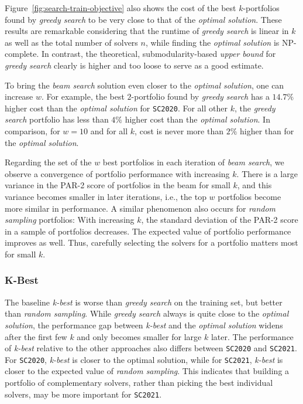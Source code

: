 \documentclass[runningheads]{llncs}
\begin{document}
Figure~\ref{fig:search-train-objective} also shows the cost of the best $k$-portfolios found by \emph{greedy search} to be very close to that of the \emph{optimal solution}.
These results are remarkable considering that the runtime of \emph{greedy search} is linear in $k$ as well as the total number of solvers $n$, while finding the \emph{optimal solution} is NP-complete.
In contrast, the theoretical, submodularity-based \emph{upper bound} for \emph{greedy search} clearly is higher and too loose to serve as a good estimate.

To bring the \emph{beam search} solution even closer to the \emph{optimal solution}, one can increase $w$.
For example, the best $2$-portfolio found by \emph{greedy search} has a $14.7\%$ higher cost than the \emph{optimal solution} for \texttt{SC2020}.
For all other $k$, the \emph{greedy search} portfolio has less than $4\%$ higher cost than the \emph{optimal solution}.
In comparison, for $w=10$ and for all $k$, cost is never more than $2\%$ higher than for the \emph{optimal solution}.

Regarding the set of the $w$ best portfolios in each iteration of \emph{beam search}, we observe a convergence of portfolio performance with increasing $k$. 
There is a large variance in the PAR-2 score of portfolios in the beam for small $k$, and this variance becomes smaller in later iterations, i.e., the top $w$ portfolios become more similar in performance.
A similar phenomenon also occurs for \emph{random sampling} portfolios:
With increasing $k$, the standard deviation of the PAR-2 score in a sample of portfolios decreases.
The expected value of portfolio performance improves as well.
Thus, carefully selecting the solvers for a portfolio matters most for small $k$.

\subsubsection{K-Best}

The baseline \emph{k-best} is worse than \emph{greedy search} on the training set, but better than \emph{random sampling}.
While \emph{greedy search} always is quite close to the \emph{optimal solution}, the performance gap between \emph{k-best} and the \emph{optimal solution} widens after the first few $k$ and only becomes smaller for large $k$ later.
The performance of \emph{k-best} relative to the other approaches also differs between \texttt{SC2020} and \texttt{SC2021}.
For \texttt{SC2020}, \emph{k-best} is closer to the optimal solution, while for \texttt{SC2021}, \emph{k-best} is closer to the expected value of \emph{random sampling}.
This indicates that building a portfolio of complementary solvers, rather than picking the best individual solvers, may be more important for \texttt{SC2021}. 
\end{document}

